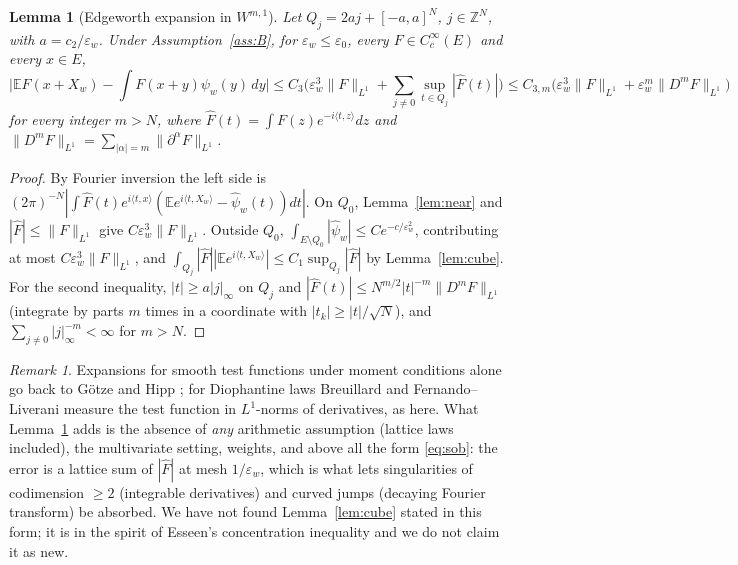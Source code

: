\documentclass[10pt]{article}
\newtheorem{lemma}[theorem]{Lemma}
\theoremstyle{definition}
\theoremstyle{remark}
\newtheorem{remark}[theorem]{Remark}
\newcommand{\Z}{\mathbb{Z}}
\newcommand{\E}{\mathbb{E}}
\newcommand{\inner}[2]{\langle #1, #2\rangle}
\newcommand{\ew}{\varepsilon_w}
\begin{document}
\begin{lemma}[Edgeworth expansion in $W^{m,1}$]\label{lem:sobolev}
Let $Q_j=2aj+[-a,a]^N$, $j\in\Z^N$, with $a=c_2/\ew$. Under Assumption~\ref{ass:B}, for $\ew\le\varepsilon_0$, every
$F\in C_c^\infty(E)$ and every $x\in E$,
\begin{equation}\label{eq:sob}
\Big|\E F(x+X_w)-\int F(x+y)\psi_w(y)\,dy\Big|\le C_3\Big(\ew^3\|F\|_{L^1}+\sum_{j\ne0}\sup_{t\in Q_j}|\widehat F(t)|\Big)
\le C_{3,m}\big(\ew^3\|F\|_{L^1}+\ew^m\|D^mF\|_{L^1}\big)
\end{equation}
for every integer $m>N$, where $\widehat F(t)=\int F(z)e^{-i\inner tz}dz$ and
$\|D^mF\|_{L^1}=\sum_{|\alpha|=m}\|\partial^\alpha F\|_{L^1}$.
\end{lemma}
\begin{proof}
By Fourier inversion the left side is $(2\pi)^{-N}|\int\widehat F(t)e^{i\inner tx}(\E e^{i\inner t{X_w}}-\widehat\psi_w(t))dt|$.
On $Q_0$, Lemma~\ref{lem:near} and $|\widehat F|\le\|F\|_{L^1}$ give $C\ew^3\|F\|_{L^1}$. Outside $Q_0$,
$\int_{E\setminus Q_0}|\widehat\psi_w|\le Ce^{-c/\ew^2}$, contributing at most $C\ew^3\|F\|_{L^1}$, and
$\int_{Q_j}|\widehat F||\E e^{i\inner t{X_w}}|\le C_1\sup_{Q_j}|\widehat F|$ by Lemma~\ref{lem:cube}. For the second
inequality, $|t|\ge a|j|_\infty$ on $Q_j$ and $|\widehat F(t)|\le N^{m/2}|t|^{-m}\|D^mF\|_{L^1}$ (integrate by parts $m$
times in a coordinate with $|t_k|\ge|t|/\sqrt N$), and $\sum_{j\ne0}|j|_\infty^{-m}<\infty$ for $m>N$.
\end{proof}

\begin{remark}\label{rem:sob}
Expansions for smooth test functions under moment conditions alone go back to G\"otze and Hipp \cite{gh}; for
Diophantine laws Breuillard \cite{breuillard} and Fernando--Liverani \cite{fl} measure the test function in $L^1$-norms
of derivatives, as here. What Lemma~\ref{lem:sobolev} adds is the absence of \emph{any} arithmetic assumption (lattice
laws included), the multivariate setting, weights, and above all the form \eqref{eq:sob}: the error is a lattice sum of
$|\widehat F|$ at mesh $1/\ew$, which is what lets singularities of codimension $\ge2$ (integrable derivatives) and
curved jumps (decaying Fourier transform) be absorbed. We have not found Lemma~\ref{lem:cube} stated in this form; it
is in the spirit of Esseen's concentration inequality and we do not claim it as new.
\end{remark}
\end{document}
